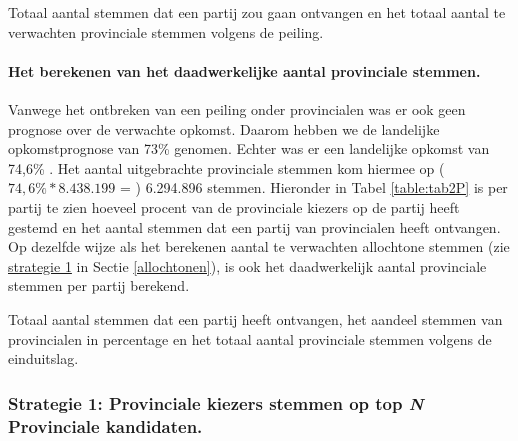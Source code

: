 \begin{table}[h]
\centering
	\begin{footnotesize}
		
	\end{footnotesize}
			\caption{Totaal aantal stemmen dat een partij zou gaan ontvangen en het totaal aantal te verwachten provinciale stemmen volgens de peiling.}
\label{table:tab1P} 
\end{table}


\paragraph{Het berekenen van het daadwerkelijke aantal provinciale stemmen.}

Vanwege het ontbreken van een peiling onder provincialen was er ook geen prognose over de verwachte opkomst. Daarom hebben we de landelijke opkomstprognose van 73\% genomen. Echter was er een landelijke opkomst van 74,6\% \citep{Kiesraad_uitslag}. Het aantal uitgebrachte provinciale stemmen kom hiermee op ($74,6\%*8.438.199$ = ) 6.294.896 stemmen. Hieronder in Tabel \ref{table:tab2P} is per partij te zien hoeveel procent van de provinciale kiezers op de partij heeft gestemd en het aantal stemmen dat een partij van provincialen heeft ontvangen. Op dezelfde wijze als het berekenen aantal te verwachten allochtone stemmen (zie \hyperref[S1A]{strategie 1} in Sectie \ref{allochtonen}), is ook het daadwerkelijk aantal provinciale stemmen per partij berekend. 
   
\begin{table}[h]
\centering
	\begin{footnotesize}
		
	\end{footnotesize}
			\caption{Totaal aantal stemmen dat een partij heeft ontvangen, het aandeel stemmen van provincialen in percentage en het totaal aantal provinciale stemmen volgens de einduitslag.}
\label{table:tab2P} 
\end{table}

\subsubsection{Strategie 1: Provinciale kiezers stemmen op top \textit{N} Provinciale kandidaten.}
\label{sssec:S1P}


